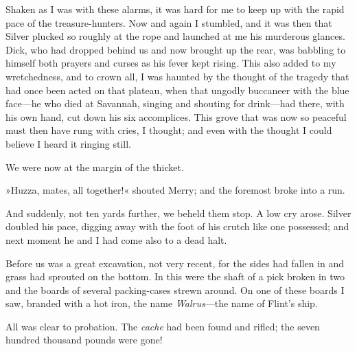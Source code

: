 Shaken as I was with these alarms, it was hard for me to keep up with the rapid pace of the treasure-hunters. Now and again I stumbled, and it was then that Silver plucked so roughly at the rope and launched at me his murderous glances. Dick, who had dropped behind us and now brought up the rear, was babbling to himself both prayers and curses as his fever kept rising. This also added to my wretchedness, and to crown all, I was haunted by the thought of the tragedy that had once been acted on that plateau, when that ungodly buccaneer with the blue face—he who died at Savannah, singing and shouting for drink—had there, with his own hand, cut down his six accomplices. This grove that was now so peaceful must then have rung with cries, I thought; and even with the thought I could believe I heard it ringing still.

We were now at the margin of the thicket.

»Huzza, mates, all together!« shouted Merry; and the foremost broke into a run.

And suddenly, not ten yards further, we beheld them stop. A low cry arose. Silver doubled his pace, digging away with the foot of his crutch like one possessed; and next moment he and I had come also to a dead halt.

Before us was a great excavation, not very recent, for the sides had fallen in and grass had sprouted on the bottom. In this were the shaft of a pick broken in two and the boards of several packing-cases strewn around. On one of these boards I saw, branded with a hot iron, the name \textit{Walrus}—the name of Flint's ship.

All was clear to probation. The \textit{cache} had been found and rifled; the seven hundred thousand pounds were gone!